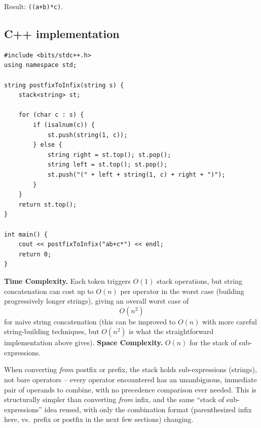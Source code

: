 Result: \texttt{((a+b)*c)}.

\subsection*{C++ implementation}

\begin{lstlisting}
#include <bits/stdc++.h>
using namespace std;

string postfixToInfix(string s) {
    stack<string> st;

    for (char c : s) {
        if (isalnum(c)) {
            st.push(string(1, c));
        } else {
            string right = st.top(); st.pop();
            string left = st.top(); st.pop();
            st.push("(" + left + string(1, c) + right + ")");
        }
    }
    return st.top();
}

int main() {
    cout << postfixToInfix("ab+c*") << endl;
    return 0;
}
\end{lstlisting}

\begin{complexitybox}
\textbf{Time Complexity.} Each token triggers $O(1)$ stack operations,
but string concatenation can cost up to $O(n)$ per operator in the worst
case (building progressively longer strings), giving an overall worst
case of
\[
  O(n^2)
\]
for naive string concatenation (this can be improved to $O(n)$ with more
careful string-building techniques, but $O(n^2)$ is what the straightforward
implementation above gives).
\textbf{Space Complexity.} $O(n)$ for the stack of sub-expressions.
\end{complexitybox}

\begin{takeawaybox}
When converting \emph{from} postfix or prefix, the stack holds
sub-expressions (strings), not bare operators -- every operator
encountered has an unambiguous, immediate pair of operands to combine,
with no precedence comparison ever needed. This is structurally simpler
than converting \emph{from} infix, and the same ``stack of
sub-expressions'' idea reused, with only the combination format
(parenthesized infix here, vs.\ prefix or postfix in the next few
sections) changing.
\end{takeawaybox}
